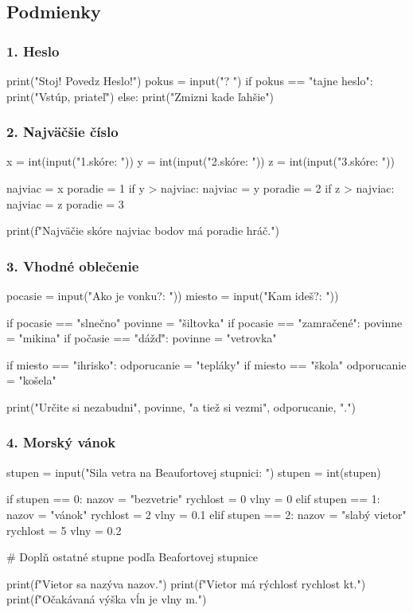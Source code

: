 \subsection{Podmienky}

\subsubsection*{1. Heslo}
\begin{solution}
print("Stoj! Povedz Heslo!")
pokus = input("? ")
if pokus == "tajne heslo":
    print("Vstúp, priateľ")
else:
    print("Zmizni kade ľahšie")
\end{solution}

\subsubsection*{2. Najväčšie číslo}
\begin{solution}
x = int(input("1.skóre: "))
y = int(input("2.skóre: "))
z = int(input("3.skóre: "))

najviac = x
poradie = 1
if y > najviac:
    najviac = y
    poradie = 2
if z > najviac:
    najviac = z
    poradie = 3

print(f"Najväčie skóre {najviac} bodov má {poradie} hráč.")
\end{solution}

\subsubsection*{3. Vhodné oblečenie}

\begin{solution}
pocasie = input("Ako je vonku?: "))
miesto = input("Kam ideš?: "))

if pocasie == "slnečno"
	povinne = "šiltovka"
if pocasie == "zamračené":
	povinne = "mikina"
if počasie == "dážď":
	povinne = "vetrovka"
	
if miesto == "ihrisko":
	odporucanie = "tepláky"
if miesto == "škola"
	odporucanie = "košela"

print("Určite si nezabudni", povinne, "a tiež si vezmi", odporucanie, ".")
\end{solution}

\subsubsection*{4. Morský vánok}
\begin{solution}
stupen = input("Sila vetra na Beaufortovej stupnici: ")
stupen = int(stupen)

if stupen == 0:
	nazov = "bezvetrie"
	rychlost = 0
	vlny = 0
elif stupen == 1:
	nazov = "vánok"
	rychlost = 2
	vlny = 0.1
elif stupen == 2:
	nazov = "slabý vietor"
	rychlost = 5
	vlny = 0.2

# Doplň ostatné stupne podľa Beafortovej stupnice

print(f"Vietor sa nazýva {nazov}.")
print(f"Vietor má rýchlosť {rychlost} kt.")
print(f"Očakávaná výška vĺn je {vlny} m.")
\end{solution}

